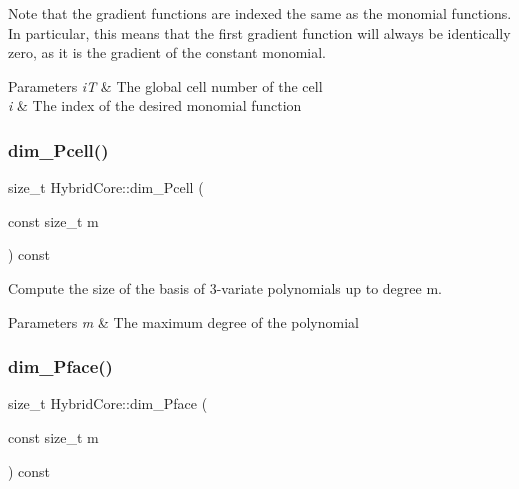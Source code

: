 Note that the gradient functions are indexed the same as the monomial functions. In particular, this means that the first gradient function will always be identically zero, as it is the gradient of the constant monomial. 
\begin{DoxyParams}{Parameters}
{\em iT} & The global cell number of the cell \\
\hline
{\em i} & The index of the desired monomial function \\
\hline
\end{DoxyParams}
\mbox{\label{classHArDCore3D_1_1HybridCore_aa2bdc59d150566e1b992058031509d2f}} 
\subsubsection{\texorpdfstring{dim\+\_\+\+Pcell()}{dim\_Pcell()}}
{\footnotesize\ttfamily size\+\_\+t Hybrid\+Core\+::dim\+\_\+\+Pcell (\begin{DoxyParamCaption}\item[{const size\+\_\+t}]{m }\end{DoxyParamCaption}) const}



Compute the size of the basis of 3-\/variate polynomials up to degree m. 


\begin{DoxyParams}{Parameters}
{\em m} & The maximum degree of the polynomial \\
\hline
\end{DoxyParams}
\mbox{\label{classHArDCore3D_1_1HybridCore_a52d3a5aa6d681847e90c41d91abb360e}} 
\subsubsection{\texorpdfstring{dim\+\_\+\+Pface()}{dim\_Pface()}}
{\footnotesize\ttfamily size\+\_\+t Hybrid\+Core\+::dim\+\_\+\+Pface (\begin{DoxyParamCaption}\item[{const size\+\_\+t}]{m }\end{DoxyParamCaption}) const}



